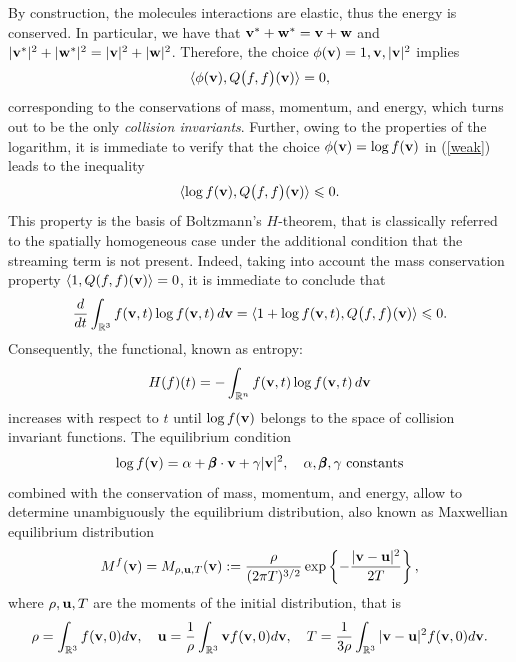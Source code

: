 \documentclass{article}
\newcommand{\bv}{\mathrm{BV}}
\renewcommand{\le}{\leqslant}
\newcommand{\fer}[1]{(\ref{#1})}
\newcommand{\R}{\mathbb R}
\def\R{\mathbb{R}}
\def\bu{{\bf u}}
\def\bv{{\bf v}}
\def\bw{{\bf w}}
\def\bbeta{{\pmb\beta}}
\def \erre{\mathbb{R}}
\begin{document}
% 
By construction, the molecules interactions are elastic, thus the energy is conserved.
% 
In particular, we have that $\bv^* +\bw^* = \bv +\bw$ and $|\bv^*|^2 +|\bw^*|^2 = |\bv|^2 +|\bw|^2$.
% 
Therefore, the choice $\phi(\bv) = 1, \bv, |\bv|^2$ implies
\[
\langle \phi(\bv), Q\bigl(f,f\bigr)(\bv)\rangle = 0,
\]
corresponding to the conservations of mass, momentum, and energy, which turns out to be the only \emph{collision invariants}. 
% 
Further, owing to the properties of the logarithm, it is immediate to verify that the choice $\phi(\bv) = \log f(\bv)$ in \fer{weak} leads to the inequality
% 
\[
\langle \log f(\bv), Q\bigl(f,f\bigr)(\bv)\rangle \le 0.
\]
% 
This property is the basis of Boltzmann's $H$-theorem, that is classically referred to the spatially homogeneous case under the additional condition that the streaming term is not present.
% 
Indeed, taking into account the mass conservation property $\langle 1,Q(f,f)(\bv)\rangle = 0$, it is immediate to conclude that 
\begin{equation}
    \label{H-dec}
    \frac d{dt} \int_{\R^3} f(\bv,t)\log f(\bv,t) \, d\bv = \langle 1+ \log f(\bv,t), Q\bigl(f,f\bigr)(\bv)\rangle \le 0.
\end{equation}
Consequently, the functional,
known as entropy:
\begin{equation}
    \label{entropy}
    H(f)(t) = -\int_{\erre^n} f(\bv, t) \log f(\bv, t) \, d\bv  
\end{equation} 
increases with respect to $t$ until $\log f(\bv)$ belongs to the space of collision invariant functions. 
% 
The equilibrium condition
% 
\[
    \log f(\bv) = \alpha + {\bbeta} \cdot \bv + \gamma |\bv|^2, \quad \alpha,{\bbeta}, \gamma {\rm \,\, constants}
\]
% 
combined with the conservation of mass, momentum, and energy, allow to determine unambiguously the equilibrium distribution, also known as Maxwellian equilibrium distribution
% 
\begin{equation}
    \label{gau}
    M^f(\bv) = M_{\rho, \bu,T}(\bv) := \frac \rho{(2\pi T)^{3/2}}\exp\left\{-\frac{|\bv -\bu|^2}{2T}\right\},
\end{equation}
% 
where $\rho, \bu, T$ are the moments of the initial distribution, that is
\begin{equation}
    \label{eq:moments_fixed}
    \rho = \int_{\R^3}f(\bv,0) d \bv, \quad \bu = \frac 1\rho\int_{\R^3}\bv f(\bv,0) d \bv, \quad
T = \frac 1{3\rho}\int_{\R^3}|\bv-\bu|^2 f(\bv,0) d \bv.
\end{equation}
% 
% 
\end{document}
